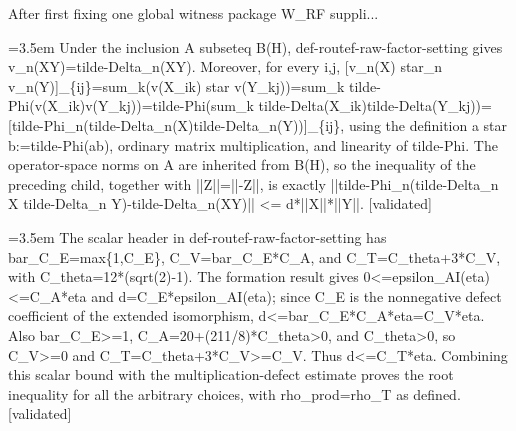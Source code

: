 \documentclass{article}
\newcommand{\step}[1]{\par\noindent\hangindent=3.5em\hangafter=1%
  \makebox[3.5em][l]{\textbf{#1.}}}
\newcommand{\steptag}[1]{\hfill{\small\textsf{[#1]}}}
\begin{document}
\begin{proofbox}{After first fixing one global witness package W\_RF suppli...}
\step{1.2.2} Under the inclusion A subseteq B(H), def-routef-raw-factor-setting gives v\_n(XY)=tilde-Delta\_n(XY). Moreover, for every i,j, [v\_n(X) star\_n v\_n(Y)]\_\{ij\}=sum\_k(v(X\_ik) star v(Y\_kj))=sum\_k tilde-Phi(v(X\_ik)v(Y\_kj))=tilde-Phi(sum\_k tilde-Delta(X\_ik)tilde-Delta(Y\_kj))=[tilde-Phi\_n(tilde-Delta\_n(X)tilde-Delta\_n(Y))]\_\{ij\}, using the definition a star b:=tilde-Phi(ab), ordinary matrix multiplication, and linearity of tilde-Phi. The operator-space norms on A are inherited from B(H), so the inequality of the preceding child, together with ||Z||=||-Z||, is exactly ||tilde-Phi\_n(tilde-Delta\_n X tilde-Delta\_n Y)-tilde-Delta\_n(XY)|| <= d*||X||*||Y||. \steptag{validated} \\[4pt]
\step{1.3} The scalar header in def-routef-raw-factor-setting has bar\_C\_E=max\{1,C\_E\}, C\_V=bar\_C\_E*C\_A, and C\_T=C\_theta+3*C\_V, with C\_theta=12*(sqrt(2)-1). The formation result gives 0<=epsilon\_AI(eta)<=C\_A*eta and d=C\_E*epsilon\_AI(eta); since C\_E is the nonnegative defect coefficient of the extended isomorphism, d<=bar\_C\_E*C\_A*eta=C\_V*eta. Also bar\_C\_E>=1, C\_A=20+(211/8)*C\_theta>0, and C\_theta>0, so C\_V>=0 and C\_T=C\_theta+3*C\_V>=C\_V. Thus d<=C\_T*eta. Combining this scalar bound with the multiplication-defect estimate proves the root inequality for all the arbitrary choices, with rho\_prod=rho\_T as defined. \steptag{validated} \\[4pt]
\end{proofbox}
\end{document}
